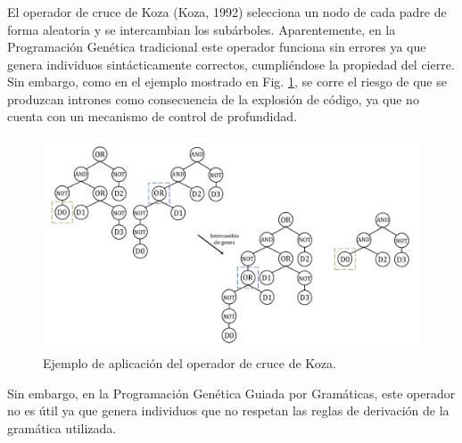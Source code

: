 \documentclass[spanish,a4paper,12pt,twoside]{report}
\begin{document}
        \subsubsection*{\vspace{-0.5cm}{\normalsize Operador de Koza}}
        \vspace{-0.5cm}
        El operador de cruce de Koza (Koza, 1992) selecciona un nodo de cada padre de forma aleatoria y se intercambian los subárboles. Aparentemente, en la Programación Genética tradicional este operador funciona sin errores ya que genera individuos sintácticamente correctos, cumpliéndose la propiedad del cierre. Sin embargo, como en el ejemplo mostrado en Fig. \ref{fig:3}, se corre el riesgo de que se produzcan intrones como consecuencia de la explosión de código, ya que no cuenta con un mecanismo de control de profundidad.
        \begin{figure}[H]
          \centering
          \includegraphics[width = 1\textwidth]{resources/Fig3.pdf}
          \caption{Ejemplo de aplicación del operador de cruce de Koza.}
          \label{fig:3}
        \end{figure} \par
        Sin embargo, en la Programación Genética Guiada por Gramáticas, este operador no es útil ya que genera individuos que no respetan las reglas de derivación de la gramática utilizada.
        
\end{document}
